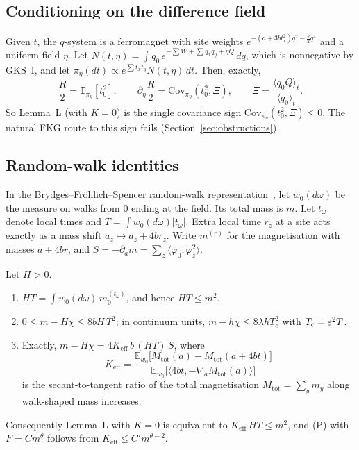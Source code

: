 \subsection{Conditioning on the difference field}
Given $t$, the $q$-system is a ferromagnet with site weights $e^{-(a+3bt_x^2)q^2-\frac b2q^4}$ and a uniform field $\eta$. Let $N(t,\eta)=\int q_0\,e^{-\sum W+\sum q_xq_y+\eta Q}\,dq$, which is nonnegative by GKS~I, and let $\pi_\eta(dt)\propto e^{\sum t_xt_y}N(t,\eta)\,dt$. Then, exactly,
\[
\frac R2=\mathbb E_{\pi_\eta}[t_0^2],\qquad \partial_\eta\frac R2=\mathrm{Cov}_{\pi_\eta}(t_0^2,\Xi),\qquad \Xi=\frac{\langle q_0Q\rangle_t}{\langle q_0\rangle_t}.
\]
So Lemma~L (with $K=0$) is the single covariance sign $\mathrm{Cov}_{\pi_\eta}(t_0^2,\Xi)\le0$. The natural FKG route to this sign fails (Section~\ref{sec:obstructions}).

\subsection{Random-walk identities}
In the Brydges--Fr\"ohlich--Spencer random-walk representation~\cite{BFS82,FFS92}, let $w_0(d\omega)$ be the measure on walks from $0$ ending at the field. Its total mass is $m$. Let $t_\omega$ denote local times and $T=\int w_0(d\omega)|t_\omega|$. Extra local time $r_z$ at a site acts exactly as a mass shift $a_z\mapsto a_z+4br_z$. Write $m^{(r)}$ for the magnetisation with masses $a+4br$, and $S=-\partial_am=\sum_z\langle\varphi_0;\varphi_z^2\rangle$.

\begin{proposition}\label{prop:walk}
Let $H>0$.
\begin{enumerate}
\item $HT=\int w_0(d\omega)\,m_0^{(t_\omega)}$, and hence $HT\le m^2$.
\item $0\le m-H\chi\le 8bH\,T^2$; in continuum units, $m-h\chi\le8\lambda hT_c^2$ with $T_c=\varepsilon^2T$.
\item Exactly, $m-H\chi=4K_{\mathrm{eff}}\,b\,(HT)\,S$, where
\[
K_{\mathrm{eff}}=\frac{\mathbb E_{w_0}\big[M_{\mathrm{tot}}(a)-M_{\mathrm{tot}}(a+4bt)\big]}{\mathbb E_{w_0}\big[\langle4bt,-\nabla_aM_{\mathrm{tot}}(a)\rangle\big]}
\]
is the secant-to-tangent ratio of the total magnetisation $M_{\mathrm{tot}}=\sum_ym_y$ along walk-shaped mass increases.
\end{enumerate}
Consequently Lemma~L with $K=0$ is equivalent to $K_{\mathrm{eff}}\,HT\le m^2$, and (P) with $F=Cm^\theta$ follows from $K_{\mathrm{eff}}\le C'm^{\theta-2}$.
\end{proposition}

